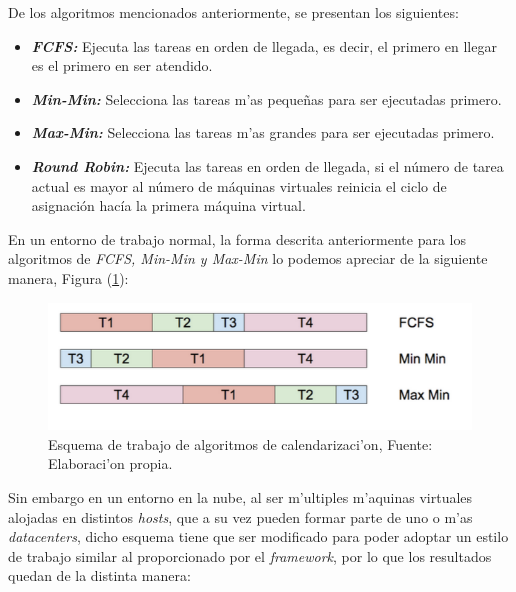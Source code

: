 De los algoritmos mencionados anteriormente, se presentan los siguientes:


\begin{itemize}
	\item \textit{\textbf{FCFS:}} Ejecuta las tareas en orden de llegada, es decir, el primero en llegar es el primero en ser atendido.
	\item \textit{\textbf{Min-Min:}} Selecciona las tareas m'as pequeñas para ser ejecutadas primero.
	\item  \textit{\textbf{Max-Min:}} Selecciona las tareas m'as grandes para ser ejecutadas primero.
	\item \textit{\textbf{Round Robin:}} Ejecuta las tareas en orden de llegada, si el número de tarea actual es mayor al número de máquinas virtuales reinicia el ciclo de asignación hacía la primera máquina virtual.
\end{itemize}

En un entorno de trabajo normal, la forma descrita anteriormente para los algoritmos de \textit{FCFS, Min-Min y Max-Min} lo podemos apreciar de la siguiente manera, Figura (\ref{fig:cuatro}):


\renewcommand\thefigure{\arabic{figure}}
\begin{figure}[H]
	\centering
	\includegraphics[scale=0.7]{media/imagendos}
	\caption{Esquema de trabajo de algoritmos de calendarizaci'on, Fuente: Elaboraci'on propia.}
	\label{fig:cuatro}
\end{figure}


Sin embargo en un entorno en la nube, al ser m'ultiples m'aquinas virtuales alojadas en distintos \textit{hosts}, que a su vez pueden formar parte de uno o m'as \textit{datacenters}, dicho esquema tiene que ser modificado para poder adoptar un estilo de trabajo similar al proporcionado por el \textit{framework}, por lo que los resultados quedan de la distinta manera:

\newpage

